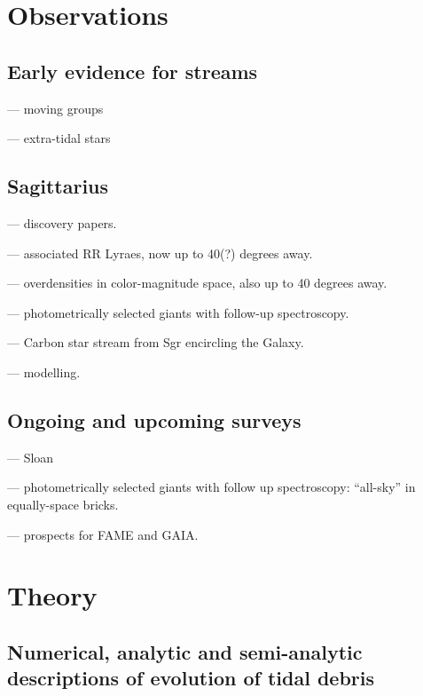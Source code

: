 


\section{Observations}

\subsection{Early evidence for streams}

\cite{majewski94,majewski96} --- moving groups

\cite{irwin95,grillmair95} --- extra-tidal stars

\subsection{Sagittarius}

\cite{ibata94,ibata95,ibata97} --- discovery papers.

\cite{mateo96,alard96,alcock97,sdss1,martinez01} --- associated
RR Lyraes, now up to 40(?) degrees away.

\cite{mateo98,majewski99,sdss2} --- overdensities in color-magnitude space,
also up to 40 degrees away.

\cite{dohmp01} --- photometrically selected giants with follow-up
spectroscopy.

\cite{ibata01a} --- Carbon star stream from Sgr encircling the Galaxy.

\cite{jsh95,johnston99,helmi01,ibata01a,ibata01b} --- modelling.

\subsection{Ongoing and upcoming surveys}

\cite{sdss1,sdss2} --- Sloan

\cite{ggss1,spag} --- photometrically selected giants with follow
up spectroscopy: ``all-sky'' in equally-space bricks.

\cite{helmi00} --- prospects for FAME and GAIA.

\section{Theory}

\subsection{Numerical, analytic and semi-analytic descriptions of
evolution of tidal debris}

